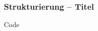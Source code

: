 \begin{frame}
    \frametitle{Strukturierung -- Titel}
    \begin{block}{Code}
        
    \end{block}
\end{frame}
